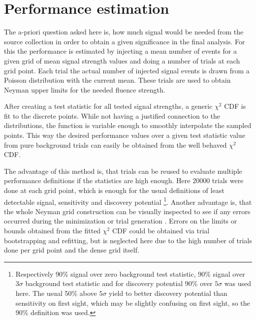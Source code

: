 \section{Performance estimation}
The a-priori question asked here is, how much signal would be needed from the source collection in order to obtain a given significance in the final analysis.
For this the performance is estimated by injecting a mean number of events for a given grid of mean signal strength values and doing a number of trials at each grid point.
Each trial the actual number of injected signal events is drawn from a Poisson distribution with the current mean.
These trials are used to obtain Neyman upper limits  for the needed fluence strength.

After creating a test statistic for all tested signal strengths, a generic $\chi^2$ CDF is fit to the discrete points.
While not having a justified connection to the distributions, the function is variable enough to smoothly interpolate the sampled points.
This way the desired performance values over a given test statistic value from pure background trials can easily be obtained from the well behaved $\chi^2$ CDF.

The advantage of this method is, that trials can be reused to evaluate multiple performance definitions if the statistics are high enough.
Here $\num{20000}$ trials were done at each grid point, which is enough for the usual definitions of least detectable signal, sensitivity and discovery potential \footnote{Respectively 90\% signal over zero background test statistic, 90\% signal over $3\sigma$ background test statistic and for discovery potential 90\% over $5\sigma$ was used here. The usual 50\% above $5\sigma$ yield to better discovery potential than sensitivity on first sight, which may be slightly confusing on first sight, so the 90\% definition was used.}.
Another advantage is, that the whole Neyman grid construction can be visually inspected to see if any errors occurred during the minimization or trial generation .
Errors on the limits or bounds obtained from the fitted $\chi^2$ CDF could be obtained via trial bootstrapping and refitting, but is neglected here due to the high number of trials done per grid point and the dense grid itself.

